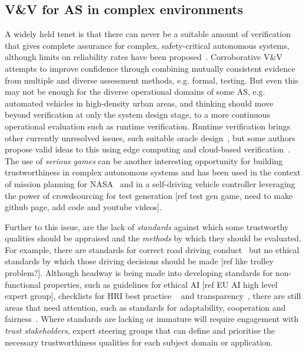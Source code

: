 \subsection{V\&V for AS in complex environments} \label{sec:intro-vav}

A widely held tenet is that there can never be a suitable amount of verification that gives complete assurance for complex, safety-critical autonomous systems, although limits on reliability rates have been proposed~\cite{Butler1993}. Corroborative V\&V~\cite{webster2020corroborative} attempts to improve confidence through combining mutually consistent evidence from multiple and diverse assessment methods, e.g. formal, testing. 
%
But even this may not be enough for the diverse operational domains of some AS, e.g. automated vehicles in high-density urban areas, and thinking should move beyond verification at only the system design stage, to a more continuous operational evaluation such as runtime verification. Runtime verification brings other currently unresolved issues, such suitable oracle design~\cite{Leucker2009}, but some authors propose valid ideas to this using edge computing and cloud-based verification~\cite{CyRes20,eder2021cyres}. 
%
The use of \emph{serious games} can be another interesting opportunity for building trustworthiness in complex autonomous systems and has been used in the context of mission planning for NASA~\cite{Allen2018} and in a self-driving vehicle controller leveraging the power of crowdsourcing for test generation [ref test gen game, need to make github page, add code and youtube videos]. 

Further to this issue, are the lack of \emph{standards} against which some trustworthy qualities should be appraised and the \emph{methods} by which they should be evaluated. For example, there are standards for correct road driving conduct~\cite{highwayCode} but no ethical standards by which those driving decisions should be made [ref like trolley problem?]. 
%
Although headway is being made into developing standards for non-functional properties, such as guidelines for ethical AI [ref EU AI high level expert group], checklists for HRI best practice ~\cite{kraus2022trustworthy} and transparency~\cite{winfield2021ieee}, there are still areas that need attention, such as standards for adaptability, cooperation and fairness~\cite{Abeywickrama2022}. 
%
Where standards are lacking or immature will require engagement with \emph{trust stakeholders}, expert steering groups that can define and prioritise the necessary trustworthiness qualities for each subject domain or application. 

